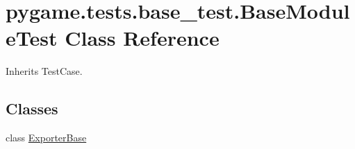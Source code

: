 \hypertarget{classpygame_1_1tests_1_1base__test_1_1_base_module_test}{}\section{pygame.\+tests.\+base\+\_\+test.\+Base\+Module\+Test Class Reference}
\label{classpygame_1_1tests_1_1base__test_1_1_base_module_test}


Inherits Test\+Case.

\subsection*{Classes}
\begin{DoxyCompactItemize}
\item 
class \hyperlink{classpygame_1_1tests_1_1base__test_1_1_base_module_test_1_1_exporter_base}{Exporter\+Base}
\end{DoxyCompactItemize}
